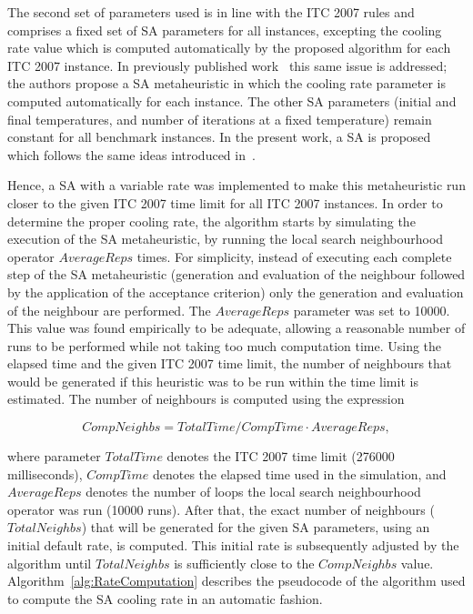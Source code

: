 The second set of parameters used is in line with the ITC 2007 rules and comprises a fixed set of SA parameters for all instances, excepting the cooling rate value which is computed automatically by the proposed algorithm for each ITC 2007 instance. In previously published work~\citep{Nunes2015,Nunes2016} this same issue is addressed; the authors propose a SA metaheuristic in which the cooling rate parameter is computed automatically for each instance. The other SA parameters (initial and final temperatures, and number of iterations at a fixed temperature) remain constant for all benchmark instances. In the present work, a SA is proposed which follows the same ideas introduced in~\citep{Nunes2015,Nunes2016}.

Hence, a SA with a variable rate was implemented to make this metaheuristic run closer to the given ITC 2007 time limit for all ITC 2007 instances. In order to determine the proper cooling rate, the algorithm starts by simulating the execution of the SA metaheuristic, by running the local search neighbourhood operator $AverageReps$ times. For simplicity, instead of executing each complete step of the SA metaheuristic (generation and evaluation of the neighbour followed by the application of the acceptance criterion) only the generation and evaluation of the neighbour are performed. The $AverageReps$ parameter was set to \num{10000}. This value was found empirically to be adequate, allowing a reasonable number of runs to be performed while not taking too much computation time. Using the elapsed time and the given ITC 2007 time limit, the number of neighbours that would be generated if this heuristic was to be run within the time limit is estimated. The number of neighbours is computed using the expression 
\begin{linenomath*}
	\begin{equation}
	CompNeighbs = TotalTime / CompTime \cdot AverageReps, \label{eq:CompNeighbs}
	\end{equation}
\end{linenomath*}
where parameter $TotalTime$ denotes the ITC 2007 time limit (\num{276000} milliseconds), $CompTime$ denotes the elapsed time used in the simulation, and $AverageReps$ denotes the number of loops the local search neighbourhood operator was run (\num{10000} runs). After that, the exact number of neighbours ($TotalNeighbs$) that will be generated for the given SA parameters, using an initial default rate, is computed. This initial rate is subsequently adjusted by the algorithm until $TotalNeighbs$ is sufficiently close to the $CompNeighbs$ value. Algorithm~\ref{alg:RateComputation} describes the pseudocode of the algorithm used to compute the SA cooling rate in an automatic fashion.



